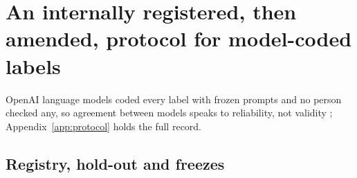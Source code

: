 
\section{An internally registered, then amended, protocol for model-coded labels}
\label{sec:protocol}

OpenAI language models coded every label with frozen prompts and no person checked any, so agreement between models
speaks to reliability, not validity \cite{pangakis2024keeping}; Appendix~\ref{app:protocol} holds the full record.

\subsection{Registry, hold-out and freezes}
\label{sec:registry}

